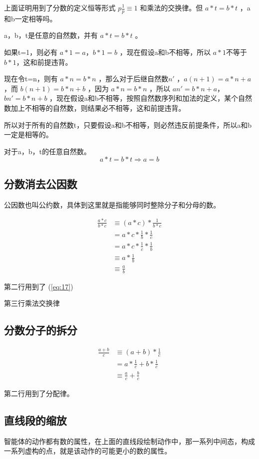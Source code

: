 \documentclass[12pt,oneside]{book}
\begin{document}
上面证明用到了分数的定义恒等形式 $p\frac{1}{p} \equiv 1$ 和乘法的交换律。但 $a*t=b*t$ ，a和b一定相等吗。

a，b，t是任意的自然数，并有 $a*t=b*t$ 。

如果t=1，则必有 $a*1 =a$，$b*1=b$ ，现在假设a和b不相等，所以 $a*1$不等于 $b*1$，这和前提违背。

现在令t=n，则有 $a*n = b*n$ ，那么对于后继自然数$n'$ ，$a(n+1)=a*n+a$ ，而 $b(n+1)=b*n+b$ ，因为 $a*n=b*n$ ，所以 $an'=b*n+a$，$bn'=b*n+b$ ，现在假设a和b不相等，按照自然数序列和加法的定义，某个自然数加上不相等的自然数，则结果必不相等，这和前提违背。

所以对于所有的自然数t，只要假设a和b不相等，则必然违反前提条件，所以a和b一定是相等的。

对于a，b，t的任意自然数。
\begin{equation}
a*t = b*t  \Rightarrow a=b
\end{equation}



\subsection{分数消去公因数}
公因数也叫公约数，具体到这里就是指能够同时整除分子和分母的数。

\begin{align*}
\frac{a*c}{b*c} &\equiv (a * c) * \frac{1}{b*c}\\
&=a * c * \frac{1}{b} * \frac{1}{c}\\
&=a*c*\frac{1}{c}*\frac{1}{b}\\
&\equiv a*\frac{1}{b}\\
&\equiv \frac{a}{b}
\end{align*}

第二行用到了 (\ref{eq:17})

第三行乘法交换律


\subsection{分数分子的拆分}
\begin{align*}
\frac{a+b}{c} &\equiv (a+b) * \frac{1}{c}\\
&=a* \frac{1}{c} + b* \frac{1}{c}\\
&\equiv \frac{a}{c} + \frac{b}{c}
\end{align*}

第二行用到了分配律。




\subsection{直线段的缩放}
智能体的动作都有数的属性，在上面的直线段绘制动作中，那一系列中间态，构成一系列虚构的点，就是该动作的可能更小的数的属性。
\end{document}
